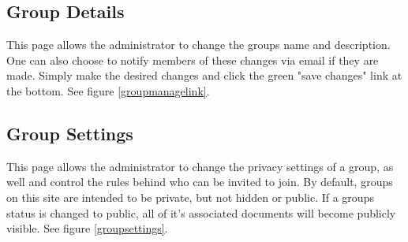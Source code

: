 \documentclass[10pt]{article}
\begin{document}
\subsection{Group Details}

\begin{flushleft}
This page allows the administrator to change the groups name and description.  One can also choose to notify members of these changes via email if they are made.  Simply make the desired changes and click the green "save changes" link at the bottom.  See figure \ref{groupmanagelink}.
\end{flushleft}

\subsection{Group Settings}

\begin{flushleft}
This page allows the administrator to change the privacy settings of a group, as well and control the rules behind who can be invited to join.  By default, groups on this site are intended to be private, but not hidden or public.  If a groups status is changed to public, all of it's associated documents will become publicly visible. See figure \ref{groupsettings}.
\end{flushleft}
\end{document}
